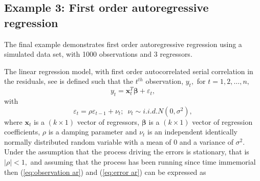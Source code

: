 \documentclass[article]{jss}
\begin{document}
\subsection{Example 3: First order autoregressive regression}
\label{sub:Example-3:-First}

The final example demonstrates first order autoregressive regression
using a simulated data set, with 1000 observations and 3 regressors.

The linear regression model, with first order autocorrelated serial
correlation in the residuals, see \citet{Zellner1971} is defined such
that the $t^{th}$ observation, $y_{t},$ for
$t=1,2,\dots,n,$
\begin{equation}
  y_{t}=\bm{x}_{t}^{T}\bm{\beta}+\varepsilon_{t},\label{eq:observation
    ar}
\end{equation} 
with
\begin{equation}
  \varepsilon_{t}=\rho\varepsilon_{t-1}+\nu_{t};\,\,\,\nu_{t}\sim
  i.i.d.N(0,\sigma^{2}),
\label{eq:error ar}
\end{equation} where
\textbf{$\bm{x}_{t}$} is a $\left(k\times1\right)$ vector of
regressors, $\bm{\beta}$ is a $\left(k\times1\right)$ vector of
regression coefficients, $\rho$ is a damping parameter and $\nu_{t}$
is an independent identically normally distributed random variable
with a mean of 0 and a variance of $\sigma^{2}.$ Under the assumption
that the process driving the errors is stationary, that is $|\rho|<1,$
and assuming that the process has been running since time immemorial
then (\ref{eq:observation ar}) and (\ref{eq:error ar}) can be
expressed as
\end{document}
